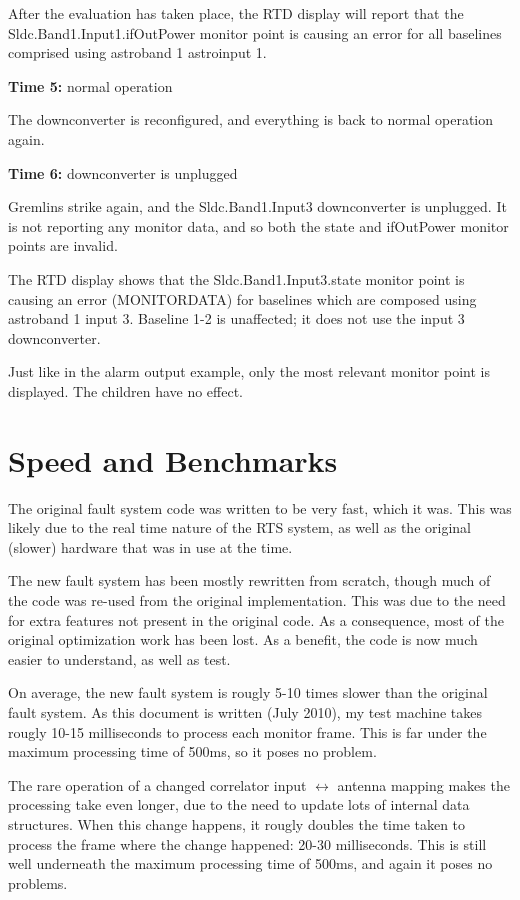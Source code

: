 \documentclass[letterpaper,12pt,oneside,pdftex]{article}
\newcommand{\mytime}[2]{\textbf{Time #1:} #2}
\begin{document}
After the evaluation has taken place, the RTD display will report that the
Sldc.Band1.Input1.ifOutPower monitor point is causing an error for all baselines
comprised using astroband 1 astroinput 1.

\mytime{5}{normal operation}

The downconverter is reconfigured, and everything is back to normal operation
again.

\mytime{6}{downconverter is unplugged}

Gremlins strike again, and the Sldc.Band1.Input3 downconverter is unplugged. It
is not reporting any monitor data, and so both the state and ifOutPower monitor
points are invalid.

The RTD display shows that the Sldc.Band1.Input3.state monitor point is causing
an error (MONITORDATA) for baselines which are composed using astroband 1 input
3. Baseline 1-2 is unaffected; it does not use the input 3 downconverter.

Just like in the alarm output example, only the most relevant monitor point is
displayed. The children have no effect.

\section{Speed and Benchmarks}

The original fault system code was written to be very fast, which it was. This
was likely due to the real time nature of the RTS system, as well as the
original (slower) hardware that was in use at the time.

The new fault system has been mostly rewritten from scratch, though much of the
code was re-used from the original implementation. This was due to the need for
extra features not present in the original code. As a consequence, most of the
original optimization work has been lost. As a benefit, the code is now much
easier to understand, as well as test.

On average, the new fault system is rougly 5-10 times slower than the original
fault system. As this document is written (July 2010), my test machine takes
rougly 10-15 milliseconds to process each monitor frame. This is far under the
maximum processing time of 500ms, so it poses no problem.

The rare operation of a changed correlator input $\leftrightarrow$ antenna
mapping makes the processing take even longer, due to the need to update lots of
internal data structures. When this change happens, it rougly doubles the time
taken to process the frame where the change happened: 20-30 milliseconds. This
is still well underneath the maximum processing time of 500ms, and again it
poses no problems.
\end{document}
